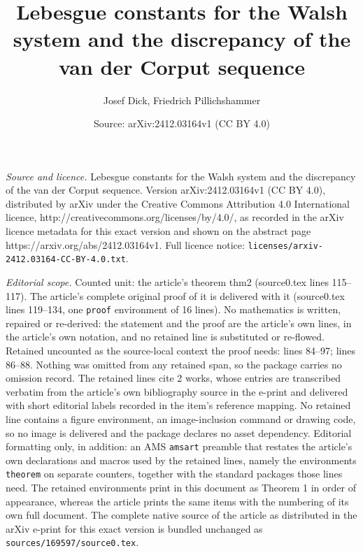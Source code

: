 \documentclass[10pt,a4paper]{amsart}
\title{Lebesgue constants for the Walsh system and the discrepancy of the van der Corput sequence}
\author{Josef Dick, Friedrich Pillichshammer}
\date{Source: arXiv:2412.03164v1 (CC BY 4.0)}
\begin{document}
\maketitle

\noindent\emph{Source and licence.} Lebesgue constants for the Walsh system and the discrepancy of the van der Corput sequence. Version arXiv:2412.03164v1 (CC BY 4.0), distributed by arXiv under the Creative Commons Attribution 4.0 International licence, http://creativecommons.org/licenses/by/4.0/, as recorded in the arXiv licence metadata for this exact version and shown on the abstract page https://arxiv.org/abs/2412.03164v1. Full licence notice: \texttt{licenses/arxiv-2412.03164-CC-BY-4.0.txt}.\par\smallskip

\noindent\textit{Editorial scope.} Counted unit: the article's theorem thm2 (source0.tex lines 115--117). The article's complete original proof of it is delivered with it (source0.tex lines 119--134, one \texttt{proof} environment of 16 lines). No mathematics is written, repaired or re-derived: the statement and the proof are the article's own lines, in the article's own notation, and no retained line is substituted or re-flowed.  Retained uncounted as the source-local context the proof needs: lines 84--97; lines 86--88.  Nothing was omitted from any retained span, so the package carries no omission record.  The retained lines cite 2 works, whose entries are transcribed verbatim from the article's own bibliography source in the e-print and delivered with short editorial labels recorded in the item's reference mapping.  No retained line contains a figure environment, an image-inclusion command or drawing code, so no image is delivered and the package declares no asset dependency.  Editorial formatting only, in addition: an AMS \texttt{amsart} preamble that restates the article's own declarations and macros used by the retained lines, namely the environments \texttt{theorem} on separate counters, together with the standard packages those lines need.  The retained environments print in this document as Theorem 1 in order of appearance, whereas the article prints the same items with the numbering of its own full document.  The complete native source of the article as distributed in the arXiv e-print for this exact version is bundled unchanged as \texttt{sources/169597/source0.tex}.
\end{document}
